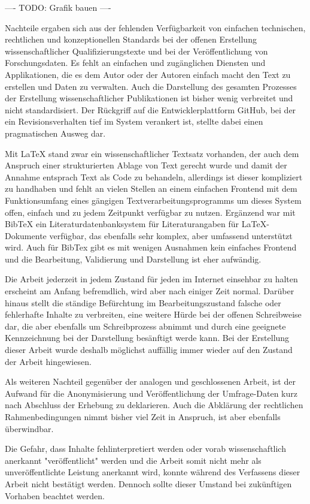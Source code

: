 ---- TODO: Grafik bauen ----

Nachteile ergaben sich aus der fehlenden Verfügbarkeit von einfachen technischen, rechtlichen und konzeptionellen Standards bei der offenen Erstellung wissenschaftlicher Qualifizierungstexte und bei der Veröffentlichung von Forschungsdaten. Es fehlt an einfachen und zugänglichen Diensten und Applikationen, die es dem Autor oder der Autoren einfach macht den Text zu erstellen und Daten zu verwalten. Auch die Darstellung des gesamten Prozesses der Erstellung wissenschaftlicher Publikationen ist bisher wenig verbreitet und nicht standardisiert. Der Rückgriff auf die Entwicklerplattform GitHub, bei der ein Revisionsverhalten tief im System verankert ist, stellte dabei einen pragmatischen Ausweg dar.

Mit LaTeX stand zwar ein wissenschaftlicher Textsatz vorhanden, der auch dem Anspruch einer strukturierten Ablage von Text gerecht wurde und damit der Annahme entsprach Text als Code zu behandeln, allerdings ist dieser kompliziert zu handhaben und fehlt an vielen Stellen an einem einfachen Frontend mit dem Funktionsumfang eines gängigen Textverarbeitungsprogramms um dieses System offen, einfach und zu jedem Zeitpunkt verfügbar zu nutzen. Ergänzend war mit BibTeX ein Literaturdatenbanksystem für Literaturangaben für LaTeX-Dokumente verfügbar, das ebenfalls sehr komplex, aber umfassend unterstützt wird. Auch für BibTex gibt es mit wenigen Ausnahmen kein einfaches Frontend und die Bearbeitung, Validierung und Darstellung ist eher aufwändig.

Die Arbeit jederzeit in jedem Zustand für jeden im Internet einsehbar zu halten erscheint am Anfang befremdlich, wird aber nach einiger Zeit normal. Darüber hinaus stellt die ständige Befürchtung im Bearbeitungszustand falsche oder fehlerhafte Inhalte zu verbreiten, eine weitere Hürde bei der offenen Schreibweise dar, die aber ebenfalls um Schreibprozess abnimmt und durch eine geeignete Kennzeichnung bei der Darstellung besänftigt werde kann. Bei der Erstellung dieser Arbeit wurde deshalb möglichst auffällig immer wieder auf den Zustand der Arbeit hingewiesen.

Als weiteren Nachteil gegenüber der analogen und geschlossenen Arbeit, ist der Aufwand für die Anonymisierung und Veröffentlichung der Umfrage-Daten kurz nach Abschluss der Erhebung zu deklarieren. Auch die Abklärung der rechtlichen Rahmenbedingungen nimmt bisher viel Zeit in Anspruch, ist aber ebenfalls überwindbar.

Die Gefahr, dass Inhalte fehlinterpretiert werden oder vorab wissenschaftlich anerkannt "veröffentlicht" werden und die Arbeit somit nicht mehr als unveröffentlichte Leistung anerkannt wird, konnte während des Verfassens dieser Arbeit nicht bestätigt werden. Dennoch sollte dieser Umstand bei zukünftigen Vorhaben beachtet werden.


